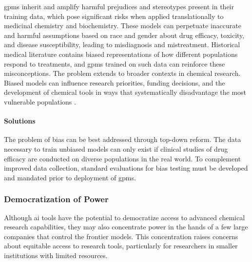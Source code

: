 \glspl{gpm} inherit and amplify harmful prejudices and stereotypes present in their training data, which pose significant risks when applied translationally to medicinal chemistry and biochemistry. \autocite{spotte-smith2025considering, yang2024demographic, omiye2023large} 
These models can perpetuate inaccurate and harmful assumptions based on race and gender about drug efficacy, toxicity, and disease susceptibility, leading to misdiagnosis and mistreatment. \autocite{chen2023algorithmic} 
Historical medical literature contains biased representations of how different populations respond to treatments, and \glspl{gpm} trained on such data can reinforce these misconceptions. \autocite{mittermaier2023bias}
The problem extends to broader contexts in chemical research. 
Biased models can influence research priorities, funding decisions, and the development of chemical tools in ways that systematically disadvantage the most vulnerable populations \autocite{dotan2019value0laden}. 

\paragraph{Solutions} The problem of bias can be best addressed through top-down reform. 
The data necessary to train unbiased models can only exist if clinical studies of drug efficacy are conducted on diverse populations in the real world.\autocite{criado-perez2019invisible} 
To complement improved data collection, standard evaluations for bias testing must be developed and mandated prior to deployment of \glspl{gpm}.


\subsubsection{Democratization of Power} 

Although \gls{ai} tools have the potential to democratize access to advanced chemical research capabilities, they may also concentrate power in the hands of a few large companies that control the frontier models. 
This concentration raises concerns about equitable access to research tools, particularly for researchers in smaller institutions with limited resources.\autocite{satariano2025a1i1}




